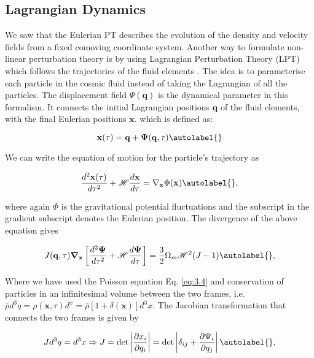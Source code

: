 \subsection{Lagrangian Dynamics}
We saw that the Eulerian PT describes the evolution of the density and velocity fields from a fixed comoving coordinate system. Another way to formulate non-linear perturbation theory is by using Lagrangian Perturbation Theory (LPT) which follows the trajectories of the fluid elements \cite{Zel1970A&A.....5...84Z, buch1989A&A...223....9B, bouchet1996introductory}. The idea is to parameterise each particle in the cosmic fluid instead of taking the Lagrangian of all the particles. The displacement field $\Psi(\mathbf{q})$ is the dynamical parameter in this formalism. It connects the initial Lagrangian positions $\mathbf{q}$ of the fluid elements, with the final Eulerian positions $\mathbf{x}$. which is defined as:


\begin{equation}
\mathbf{x}(\tau)=\mathbf{q}+\mathbf{\Psi}(\mathbf{q}, \tau) \autolabel{}
\end{equation}


We can write the equation of motion for the particle's trajectory as


\begin{equation}
    \frac{d^{2} \mathbf{x}(\tau)}{d \tau^{2}}+\mathcal{H} \frac{d \mathbf{x}}{d \tau}=\nabla_{\mathbf{x}} \Phi(\mathbf{x}) \autolabel{},
\end{equation}


where again $\Phi$ is the gravitational potential fluctuations and the subscript in the gradient subscript denotes the Eulerian position. The divergence of the above equation gives


\begin{equation}
    J(\mathbf{q}, \tau) \boldsymbol{\nabla}_{\mathbf{x}}\left[\frac{d^{2} \boldsymbol{\Psi}}{d \tau^{2}}+\mathcal{H} \frac{d \boldsymbol{\Psi}}{d \tau}\right]=\frac{3}{2} \Omega_{m} \mathcal{H}^{2}(J-1) \autolabel{},
\end{equation}


Where we have used the Poisson equation Eq. \eqref{eq:3.4} and conservation of particles in an infinitesimal volume between the two frames, i.e. $\bar{\rho} d^{3} q=\rho(\mathbf{x}, \tau) d^{x}=\bar{\rho}[1+\delta(\mathbf{x})] d^{3} x$. The Jacobian transformation that connects the two frames is given by


\begin{equation}
    J d^{3} q=d^{3} x \Rightarrow J=\operatorname{det}\left|\frac{\partial x_{i}}{\partial q_{i}}\right|=\operatorname{det}\left|\delta_{i j}+\frac{\partial \Psi_{i}}{\partial q_{j}}\right| \autolabel{},
\end{equation}


